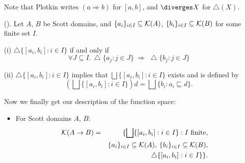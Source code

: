 Note that Plotkin writes $(a \Rightarrow b)$ for $[a, b]$, and $\diverges X$ for $\bigtriangleup (X)$.
\begin{proposition}
\label{funcon}
(\cite[Chapter 6 pp.\  14--15]{PloLN}).
Let $A$, $B$ be Scott domains, and $\{ a_{i} \}_{i \in I} \subseteq {\cal K}(A)$, $\{ b_{i} \}_{i \in I} \subseteq {\cal K}(B)$ for some finite set $I$.

\noindent (i) $\bigtriangleup \{ [a_{i}, b_{i}] : i \in I \}$ if and only if
\[ \forall J \subseteq I. \, \bigtriangleup \{ a_{j} : j \in J \} \; \Rightarrow \; \bigtriangleup \{ b_{j} : j \in J \} \]

\noindent (ii)  $\bigtriangleup \{ [a_{i}, b_{i}] : i \in I \}$ implies that $\bigsqcup \{ [a_{i}, b_{i}] : i \in I \}$ exists and is defined by
\[ ( \bigsqcup \{ [a_{i}, b_{i}] : i \in I \}) d = \bigsqcup \{ b_{i} : a_{i} \sqsubseteq d \} . \]
\end{proposition}
Now we finally get our description of the function space:
\begin{itemize}
\item For Scott domains $A$, $B$:
\begin{eqnarray*}
{\cal K}(A \rightarrow B) & = & \{ \bigsqcup \{ [a_{i}, b_{i}] : i \in I \} : \mbox{$I$ finite}, \\
& & \{ a_{i} \}_{i \in I} \subseteq {\cal K}(A), \: \{ b_{i} \}_{i \in I} \subseteq {\cal K}(B), \\
& &  \bigtriangleup \{ [a_{i}, b_{i}] : i \in I \} \} .
\end{eqnarray*}
\end{itemize}

